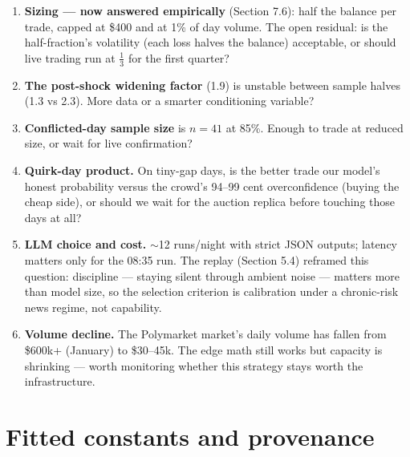 \documentclass[11pt,a4paper]{article}
\begin{document}
\begin{enumerate}
\item \textbf{Sizing --- now answered empirically} (Section 7.6): half the
balance per trade, capped at \$400 and at 1\% of day volume. The open
residual: is the half-fraction's volatility (each loss halves the balance)
acceptable, or should live trading run at $\frac{1}{3}$ for the first
quarter?
\item \textbf{The post-shock widening factor} (1.9) is unstable between sample
halves (1.3 vs 2.3). More data or a smarter conditioning variable?
\item \textbf{Conflicted-day sample size} is $n=41$ at 85\%. Enough to trade
at reduced size, or wait for live confirmation?
\item \textbf{Quirk-day product.} On tiny-gap days, is the better trade our
model's honest probability versus the crowd's 94--99 cent overconfidence
(buying the cheap side), or should we wait for the auction replica before
touching those days at all?
\item \textbf{LLM choice and cost.} $\sim$12 runs/night with strict JSON
outputs; latency matters only for the 08:35 run. The replay (Section 5.4)
reframed this question: discipline --- staying silent through ambient noise
--- matters more than model size, so the selection criterion is calibration
under a chronic-risk news regime, not capability.
\item \textbf{Volume decline.} The Polymarket market's daily volume has fallen
from \$600k+ (January) to \$30--45k. The edge math still works but capacity is
shrinking --- worth monitoring whether this strategy stays worth the
infrastructure.
\end{enumerate}

\appendix
\section{Fitted constants and provenance}
\end{document}
